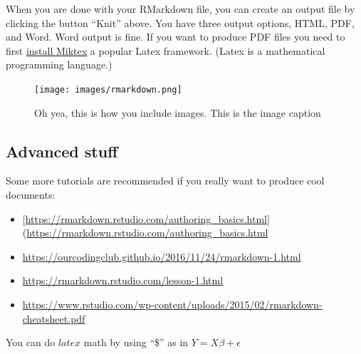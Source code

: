\documentclass[]{article}
\providecommand{\tightlist}{%
  \setlength{\itemsep}{0pt}\setlength{\parskip}{0pt}}
\begin{document}
When you are done with your RMarkdown file, you can create an output
file by clicking the button ``Knit'' above. You have three output
options, HTML, PDF, and Word. Word output is fine. If you want to
produce PDF files you need to first
\href{https://miktex.org/download}{install Miktex} a popular Latex
framework. (Latex is a mathematical programming language.)

\begin{figure}
\centering
\texttt{[image: images/rmarkdown.png]}
\caption{Oh yea, this is how you include images. This is the image
caption}
\end{figure}

\hypertarget{advanced-stuff}{%
\subsection{Advanced stuff}\label{advanced-stuff}}

Some more tutorials are recommended if you really want to produce cool
documents:

\begin{itemize}
\tightlist
\item
  {[}\url{https://rmarkdown.rstudio.com/authoring_basics.html}{]}(\url{https://rmarkdown.rstudio.com/authoring_basics.html}
\item
  \url{https://ourcodingclub.github.io/2016/11/24/rmarkdown-1.html}
\item
  \url{https://rmarkdown.rstudio.com/lesson-1.html}
\item
  \url{https://www.rstudio.com/wp-content/uploads/2015/02/rmarkdown-cheatsheet.pdf}
\end{itemize}

You can do \(latex\) math by using ``\$'' as in
\(Y = X\beta + \epsilon\)
\end{document}
